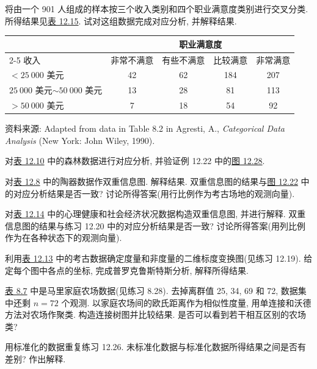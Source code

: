 
\quad 将由一个 901 人组成的样本按三个收入类别和四个职业满意度类别进行交叉分类. 所得结果见\hyperref[tab:12.15]{表 12.15}. 试对这组数据完成对应分析, 并解释结果.

\begin{mvtable}
\begin{tabular}{lcccc}
\toprule
& \multicolumn{4}{c}{职业满意度}\\
\cmidrule(lr){2-5}
收入 & 非常不满意 & 有些不满意 & 比较满意 & 非常满意\\
\midrule
$<25\ 000$ 美元 & 42 & 62 & 184 & 207\\
$25\ 000$ 美元$\sim 50\ 000$ 美元 & 13 & 28 & 81 & 113\\
$>50\ 000$ 美元 & 7 & 18 & 54 & 92\\
\bottomrule
\end{tabular}
\label{tab:12.15}
\end{mvtable}

\noindent 资料来源: Adapted from data in Table 8.2 in Agresti, A., \textit{Categorical Data Analysis} (New York: John Wiley, 1990).

\quad 对\hyperref[tab:12.10]{表 12.10} 中的森林数据进行对应分析, 并验证例 12.22 中的\hyperref[fig:12.28]{图 12.28}.

\quad 对\hyperref[tab:12.8]{表 12.8} 中的陶器数据作双重信息图. 解释结果. 双重信息图的结果与\hyperref[fig:12.22]{图 12.22} 中的对应分析结果是否一致? 讨论所得答案(用行比例作为考古场地的观测向量).

\quad 对\hyperref[tab:12.14]{表 12.14} 中的心理健康和社会经济状况数据构造双重信息图, 并进行解释. 双重信息图的结果与练习 12.20 中的对应分析结果是否一致? 讨论所得答案(用列比例作为在各种状态下的观测向量).

\quad 利用\hyperref[tab:12.13]{表 12.13} 中的考古数据确定度量和非度量的二维标度变换图(见练习 12.19). 给定每个图中各点的坐标, 完成普罗克鲁斯特斯分析, 解释所得结果.

\quad \hyperref[tab:8.7]{表 8.7} 中是马里家庭农场数据(见练习 8.28). 去掉离群值 25, 34, 69 和 72, 数据集中还剩 $n=72$ 个观测. 以家庭农场间的欧氏距离作为相似性度量, 用单连接和沃德方法对农场作聚类. 构造连接树图并比较结果. 是否可以看到若干相互区别的农场类?

\quad 用标准化的数据重复练习 12.26. 未标准化数据与标准化数据所得结果之间是否有差别? 作出解释.

